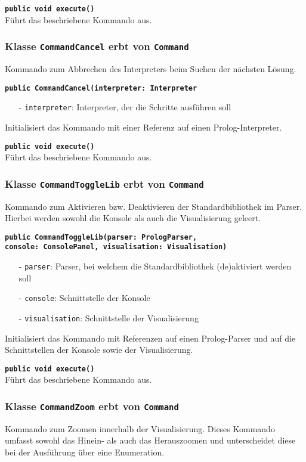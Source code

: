 \documentclass[parskip=full,11pt,twoside]{scrartcl}
\begin{document}
\textbf{\texttt{public void execute()}}\\
Führt das beschriebene Kommando aus.

\subsubsection{Klasse \texttt{CommandCancel} erbt von \texttt{Command}}
Kommando zum Abbrechen des Interpreters beim Suchen der nächsten Lösung.

\textbf{\texttt{public CommandCancel(interpreter: Interpreter}}\\
\begin{itemize}[noitemsep]
	\item[-] \texttt{interpreter}: Interpreter, der die Schritte ausführen soll
\end{itemize}
Initialisiert das Kommando mit einer Referenz auf einen Prolog-Interpreter.

\textbf{\texttt{public void execute()}}\\
Führt das beschriebene Kommando aus.

\subsubsection{Klasse \texttt{CommandToggleLib} erbt von \texttt{Command}}
Kommando zum Aktivieren bzw. Deaktivieren der Standardbibliothek im Parser. Hierbei werden sowohl die Konsole als auch die Visualisierung geleert.

\textbf{\texttt{public CommandToggleLib(parser: PrologParser,\\console: ConsolePanel, visualisation: Visualisation)}}\\
\begin{itemize}[noitemsep]
	\item[-] \texttt{parser}: Parser, bei welchem die Standardbibliothek (de)aktiviert werden soll
	\item[-] \texttt{console}: Schnittstelle der Konsole
	\item[-] \texttt{visualisation}: Schnittstelle der Visualisierung
\end{itemize}
Initialisiert das Kommando mit Referenzen auf einen Prolog-Parser und auf die Schnittstellen der Konsole sowie der Visualisierung.

\textbf{\texttt{public void execute()}}\\
Führt das beschriebene Kommando aus.

\subsubsection{Klasse \texttt{CommandZoom} erbt von \texttt{Command}}
Kommando zum Zoomen innerhalb der Visualisierung. Dieses Kommando umfasst sowohl das Hinein- als auch das Herauszoomen und unterscheidet diese bei der Ausführung über eine Enumeration.
\end{document}
